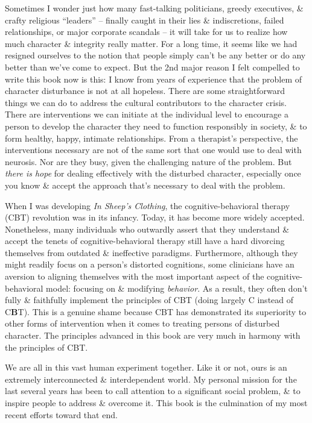 \documentclass{article}
\numberwithin{equation}{section}
\begin{document}
Sometimes I wonder just how many fast-talking politicians, greedy executives, \& crafty religious ``leaders'' -- finally caught in their lies \& indiscretions, failed relationships, or major corporate scandals -- it will take for us to realize how much character \& integrity really matter. For a long time, it seems like we had resigned ourselves to the notion that people simply can't be any better or do any better than we've come to expect. But the 2nd major reason I felt compelled to write this book now is this: I know from years of experience that the problem of character disturbance is not at all hopeless. There are some straightforward things we can do to address the cultural contributors to the character crisis. There are interventions we can initiate at the individual level to encourage a person to develop the character they need to function responsibly in society, \& to form healthy, happy, intimate relationships. From a therapist's perspective, the interventions necessary are not of the same sort that one would use to deal with neurosis. Nor are they busy, given the challenging nature of the problem. But \textit{there is hope} for dealing effectively with the disturbed character, especially once you know \& accept the approach that's necessary to deal with the problem.

When I was developing \textit{In Sheep's Clothing}, the cognitive-behavioral therapy (CBT) revolution was in its infancy. Today, it has become more widely accepted. Nonetheless, many individuals who outwardly assert that they understand \& accept the tenets of cognitive-behavioral therapy still have a hard divorcing themselves from outdated \& ineffective paradigms. Furthermore, although they might readily focus on a person's distorted cognitions, some clinicians have an aversion to aligning themselves with the most important aspect of the cognitive-behavioral model: focusing on \& modifying \textit{behavior}. As a result, they often don't fully \& faithfully implement the principles of CBT (doing largely C instead of C{\bf B}T). This is a genuine shame because CBT has demonstrated its superiority to other forms of intervention when it comes to treating persons of disturbed character. The principles advanced in this book are very much in harmony with the principles of CBT.

We are all in this vast human experiment together. Like it or not, ours is an extremely interconnected \& interdependent world. My personal mission for the last several years has been to call attention to a significant social problem, \& to inspire people to address \& overcome it. This book is the culmination of my most recent efforts toward that end.
\end{document}
